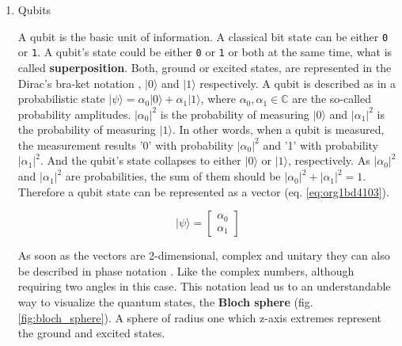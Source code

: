 \begin{enumerate}
\item Qubits
\label{sec:org227d02c}

A qubit is the basic unit of information.
A classical bit state can be either \texttt{0} or \texttt{1}.
A qubit's state could be either \texttt{0} or \texttt{1} or both at the same time, what is called \textbf{superposition}.
Both, ground or excited states, are represented in the Dirac's bra-ket notation \cite{Nielsen_2009}, \(| 0 \rangle\) and \(| 1 \rangle\) respectively.
A qubit is described as in a probabilistic state \(| \psi \rangle = \alpha_0 | 0 \rangle + \alpha_1 | 1 \rangle\), where \(\alpha_0, \alpha_1 \in \mathbb{C}\) are the so-called probability amplitudes.
\(|\alpha_0|^2\) is the probability of measuring \(| 0 \rangle\) and \(|\alpha_1|^2\) is the probability of measuring \(| 1 \rangle\).
In other words, when a qubit is measured, the measurement results '0' with probability \(|\alpha_0|^2\) and '1' with probability \(|\alpha_1|^2\).
And the qubit's state collapses to either \(| 0 \rangle\) or \(| 1 \rangle\), respectively.
As \(|\alpha_0|^2\) and \(|\alpha_1|^2\)  are probabilities, the sum of them should be \(|\alpha_0|^2 + |\alpha_1|^2 = 1\).
Therefore a qubit state can be represented as a vector (eq. \ref{eq:org1bd4103}).

\begin{equation}
\label{eq:org1bd4103}
|\psi\rangle = \begin{bmatrix}\alpha_0 \\ \alpha_1 \end{bmatrix}
\end{equation}

As soon as the vectors are 2-dimensional, complex and unitary they can also be described in phase notation \cite{Nielsen_2009}.
Like the complex numbers, although requiring two angles in this case.
This notation lead us to an understandable way to visualize the quantum states, the \textbf{Bloch sphere} (fig. \ref{fig:bloch_sphere}).
A sphere of radius one which z-axis extremes represent the ground and excited states.


\end{enumerate}
